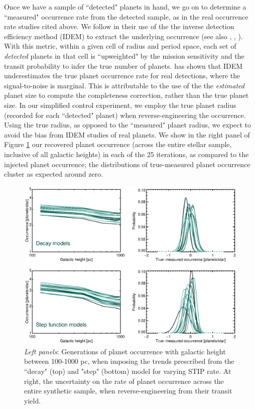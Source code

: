 \documentclass[twocolumn]{aastex631}
\begin{document}
Once we have a sample of ``detected" planets in hand, we go on to determine a ``measured" occurrence rate from the detected sample, as in the real occurrence rate studies cited above. We follow \cite{Dressing15} in their use of the the inverse detection efficiency method (IDEM) to extract the underlying occurrence (see also \citealt{Howard11a}, \citealt{Petigura13a}, \citealt{Foreman_Mackey_2014}). With this metric, within a given cell of radius and period space, each set of \textit{detected} planets in that cell is ``upweighted" by the mission sensitivity and the transit probability to infer the true number of planets. \cite{Hsu18} has shown that IDEM underestimates the true planet occurrence rate for real detections, where the signal-to-noise is marginal. This is attributable to the use of the the \textit{estimated} planet size to compute the completeness correction, rather than the true planet size. In our simplified control experiment, we employ the true planet radius (recorded for each ``detected" planet) when reverse-engineering the occurrence. Using the true radius, as opposed to the ``measured" planet radius, we expect to avoid the bias from IDEM studies of real planets. We show in the right panel of Figure \ref{fig:all_sims} our recovered planet occurrence (across the entire stellar sample, inclusive of all galactic heights) in each of the 25 iterations, as compared to the injected planet occurrence; the distributions of true-measured planet occurrence cluster as expected around zero. 

\begin{figure}
    \centering
    \includegraphics[trim={0.5cm 0 0.5cm 0}, width=6.0in]{figures/occurrence_figures_iterations.eps}
    \caption{\textit{Left panels}: Generations of planet occurrence with galactic height between 100-1000 pc, when imposing the trends prescribed from the ``decay" (top) and "step" (bottom) model for varying STIP rate. At right, the uncertainty on the rate of planet occurrence across the entire synthetic sample, when reverse-engineering from their transit yield.}
    \label{fig:all_sims}
\end{figure}
\end{document}
